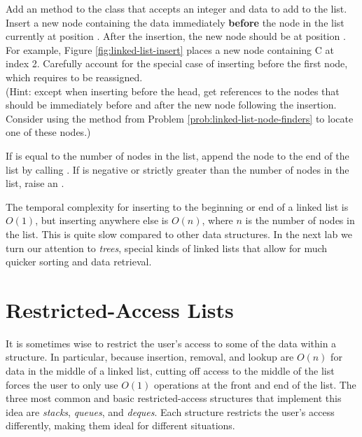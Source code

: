 \begin{problem} %
Add an  method to the  class that accepts an integer  and data to add to the list.
Insert a new node containing the data immediately \textbf{before} the node in the list currently at position .
After the insertion, the new node should be at position .
For example, Figure \ref{fig:linked-list-insert} places a new node containing C at index 2.
Carefully account for the special case of inserting before the first node, which requires  to be reassigned.
\\(Hint: except when inserting before the head, get references to the nodes that should be immediately before and after the new node following the insertion.
Consider using the  method from Problem \ref{prob:linked-list-node-finders} to locate one of these nodes.)

If  is equal to the number of nodes in the list, append the node to the end of the list by calling .
If  is negative or strictly greater than the number of nodes in the list, raise an .
\end{problem}

\begin{info} %
The temporal complexity for inserting to the beginning or end of a linked list is $O(1)$, but inserting anywhere else is $O(n)$, where $n$ is the number of nodes in the list.
This is quite slow compared to other data structures.
In the next lab we turn our attention to \emph{trees}, special kinds of linked lists that allow for much quicker sorting and data retrieval.
\end{info}

\section*{Restricted-Access Lists} %

It is sometimes wise to restrict the user's access to some of the data within a structure.
In particular, because insertion, removal, and lookup are $O(n)$ for data in the middle of a linked list, cutting off access to the middle of the list forces the user to only use $O(1)$ operations at the front and end of the list.
The three most common and basic restricted-access structures that implement this idea are \emph{stacks}, \emph{queues}, and \emph{deques}.
Each structure restricts the user's access differently, making them ideal for different situations.

